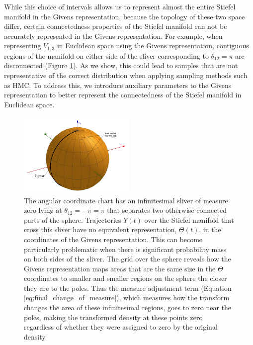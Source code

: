 \documentclass[ba]{imsart}
\numberwithin{equation}{section}
\theoremstyle{plain}
\begin{document}
\noindent While this choice of intervals allows us to represent almost the entire Stiefel manifold in the Givens representation, because the topology of these two space differ, certain connectedness properties of the Stiefel manifold can not be accurately represented in the Givens representation. For example, when representing $V_{1,3}$ in Euclidean space using the Givens representation, contiguous regions of the manifold on either side of the sliver corresponding to $\theta_{12} = \pi$ are disconnected (Figure \ref{fig:pathologies}). As we show, this could lead to samples that are not representative of the correct distribution when applying sampling methods such as HMC. To address this, we introduce auxiliary parameters to the Givens representation to better represent the connectedness of the Stiefel manifold in Euclidean space.

\begin{figure}[h]
\centering
\vspace{.1in}
\includegraphics[width=0.5\textwidth]{figures/sliver_globe.png}
\vspace{.05in}
\caption{The angular coordinate chart has an infinitesimal sliver of measure zero lying at $\theta_{12} = -\pi = \pi$ that separates two otherwise connected parts of the sphere. Trajectories $Y(t)$ over the Stiefel manifold that cross this sliver have no equivalent representation, $\Theta(t)$, in the coordinates of the Givens representation. This can become particularly problematic when there is significant probability mass on both sides of the sliver. The grid over the sphere reveals how the Givens representation maps areas that are the same size in the $\Theta$ coordinates to smaller and smaller regions on the sphere the closer they are to the poles. Thus the measure adjustment term (Equation \ref{eq:final_change_of_measure}), which measures how the transform changes the area of these infinitesimal regions, goes to zero near the poles, making the transformed density at these points zero regardless of whether they were assigned to zero by the original density.}
\label{fig:pathologies}
\end{figure}
\end{document}
